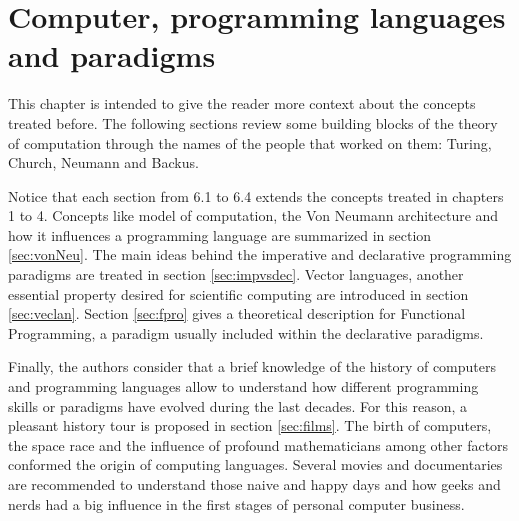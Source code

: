 \chapter{Computer, programming languages and paradigms} 

This chapter is intended to give the reader more context about the concepts treated before.  
The following sections review some building blocks of the theory of computation 
through the names of the people that worked on them: Turing, Church, Neumann and Backus.

Notice that each section from 6.1 to 6.4 extends the concepts treated in chapters 1 to 4.
Concepts like model of computation, the Von Neumann architecture and how it influences a programming language are summarized in section \ref{sec:vonNeu}.
The main ideas behind the imperative and declarative programming paradigms are treated in section \ref{sec:impvsdec}.
Vector languages, another essential property desired for scientific computing are introduced in section \ref{sec:veclan}.
Section \ref{sec:fpro} gives a theoretical description for Functional Programming, a paradigm usually included within the declarative paradigms. 
 
Finally, the authors consider that a brief knowledge of the history of computers and programming languages 
allow to understand how different programming skills or paradigms have evolved during the last decades. 
For this reason, a pleasant history tour is proposed in section \ref{sec:films}. 
The birth of computers, the space race and the influence of profound mathematicians among other factors conformed the origin of computing languages. 
Several movies and documentaries are recommended to understand those naive and happy days and how geeks and nerds had a big influence in the first stages of personal computer business.
  
  
   
  
  
 


 
 
